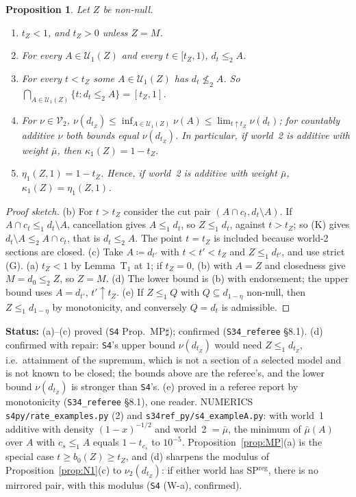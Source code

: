 \documentclass[11pt]{article}
\newtheorem{proposition}[theorem]{Proposition}
\theoremstyle{definition}
\theoremstyle{remark}
\newcommand{\src}[1]{\texttt{#1}}
\newcommand{\status}[1]{\par\smallskip\noindent\textbf{Status:} #1\par\smallskip}
\begin{document}
\begin{proposition}\label{prop:MPsharp}
Let $Z$ be non-null.
\begin{enumerate}[leftmargin=*,label=(\alph*)]
\item $t_Z<1$, and $t_Z>0$ unless $Z=M$.
\item For every $A\in\mathcal U_1(Z)$ and every $t\in[t_Z,1)$, $d_t\le_2A$.
\item For every $t<t_Z$ some $A\in\mathcal U_1(Z)$ has $d_t\not\le_2A$. So $\bigcap_{A\in\mathcal U_1(Z)}\{t:d_t\le_2A\}=[t_Z,1]$.
\item For $\nu\in\mathcal V_2$, $\nu(d_{t_Z})\le\inf_{A\in\mathcal U_1(Z)}\nu(A)\le\lim_{t\uparrow t_Z}\nu(d_t)$; for countably additive $\nu$ both bounds equal $\nu(d_{t_Z})$. In particular, if world~2 is additive with weight $\bar\mu$, then $\kappa_1(Z)=1-t_Z$.
\item $\eta_1(Z,1)=1-t_Z$. Hence, if world~2 is additive with weight $\bar\mu$, $\kappa_1(Z)=\eta_1(Z,1)$.
\end{enumerate}
\end{proposition}
\begin{proof}[Proof sketch]
(b) For $t>t_Z$ consider the cut pair $(A\cap c_t,d_t\setminus A)$. If $A\cap c_t\le_1d_t\setminus A$, cancellation gives $A\le_1d_t$, so $Z\le_1d_t$, against $t>t_Z$; so (K) gives $d_t\setminus A\le_2A\cap c_t$, that is $d_t\le_2A$. The point $t=t_Z$ is included because world-2 sections are closed. (c) Take $A\coloneqq d_{t'}$ with $t<t'<t_Z$ and $Z\le_1d_{t'}$, and use strict (G). (a) $t_Z<1$ by Lemma~T$_1$ at $1$; if $t_Z=0$, (b) with $A=Z$ and closedness give $M=d_0\le_2Z$, so $Z=M$. (d) The lower bound is (b) with endorsement; the upper bound uses $A=d_{t'}$, $t'\uparrow t_Z$. (e) If $Z\le_1Q$ with $Q\subseteq d_{1-\eta}$ non-null, then $Z\le_1d_{1-\eta}$ by monotonicity, and conversely $Q=d_t$ is admissible.
\end{proof}
\status{(a)--(c) proved (\src{S4} Prop.~MP$\sharp$); confirmed (\src{S34\_referee} \S8.1). (d) confirmed with repair: \src{S4}'s upper bound $\nu(d_{t_Z})$ would need $Z\le_1d_{t_Z}$, i.e.\ attainment of the supremum, which is not a section of a selected model and is not known to be closed; the bounds above are the referee's, and the lower bound $\nu(d_{t_Z})$ is stronger than \src{S4}'s. (e) proved in a referee report by monotonicity (\src{S34\_referee} \S8.1), one reader. NUMERICS \src{s4py/rate\_examples.py} (2) and \src{s34ref\_py/s4\_exampleA.py}: with world~1 additive with density $(1-x)^{-1/2}$ and world~2 $=\bar\mu$, the minimum of $\bar\mu(A)$ over $A$ with $c_s\le_1A$ equals $1-t_{c_s}$ to $10^{-5}$. Proposition~\ref{prop:MP}(a) is the special case $t\ge b_0(Z)\ge t_Z$, and (d) sharpens the modulus of Proposition~\ref{prop:N1}(c) to $\nu_2(d_{t_Z})$: if either world has SP$^{\mathrm{reg}}$, there is no mirrored pair, with this modulus (\src{S4} (W-a), confirmed).}
\end{document}
